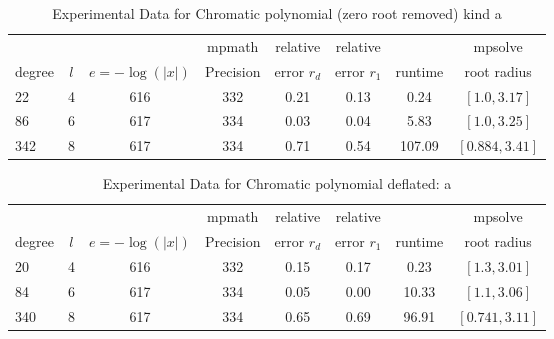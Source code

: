 \documentclass[sigconf]{acmart}
\begin{document}
\begin{table}[t]
\caption{Experimental Data for Chromatic polynomial (zero root removed) kind a}
\label{tab:chrma}
\vskip -0.15in
\begin{center}
\begin{small}
\begin{sc}
\begin{tabular}{lccccccc}
\toprule
&  &  & mpmath & relative  & relative &  & mpsolve \\
degree  & $l$& $e=-\log(|x|)$& Precision &error $r_d$       & error $r_1$ &runtime& root radius\\
\midrule
 22   & 4 & 616 & 332 & 0.21 & 0.13 & 0.24 & $[1.0, 3.17]$ \\
 86   & 6 & 617 & 334 & 0.03 & 0.04 & 5.83 & $[1.0, 3.25 ]$ \\
 342 & 8 & 617 & 334 & 0.71 & 0.54 & 107.09 & $[0.884, 3.41]$\\
\bottomrule
\end{tabular}
\end{sc}
\end{small}
\end{center}
\vskip 0.05in
\end{table}


\begin{table}[t]
\caption{Experimental Data for Chromatic polynomial deflated: a}
\label{tab:chrma_d}
\vskip -0.15in
\begin{center}
\begin{small}
\begin{sc}
\begin{tabular}{lccccccc}
\toprule
&  &  & mpmath & relative  & relative &  & mpsolve \\
degree  & $l$& $e=-\log(|x|)$& Precision &error $r_d$       & error $r_1$ &runtime& root radius\\
\midrule
   20 & 4 & 616 & 332 & 0.15 & 0.17 &   0.23 & $[1.3, 3.01]$ \\
   84 & 6 & 617 & 334 & 0.05 & 0.00 & 10.33 & $[1.1, 3.06]$\\
 340 & 8 & 617 & 334 & 0.65 & 0.69 & 96.91 & $[0.741, 3.11]$\\
\bottomrule
\end{tabular}
\end{sc}
\end{small}
\end{center}
\vskip -0.1in
\end{table}
\end{document}
